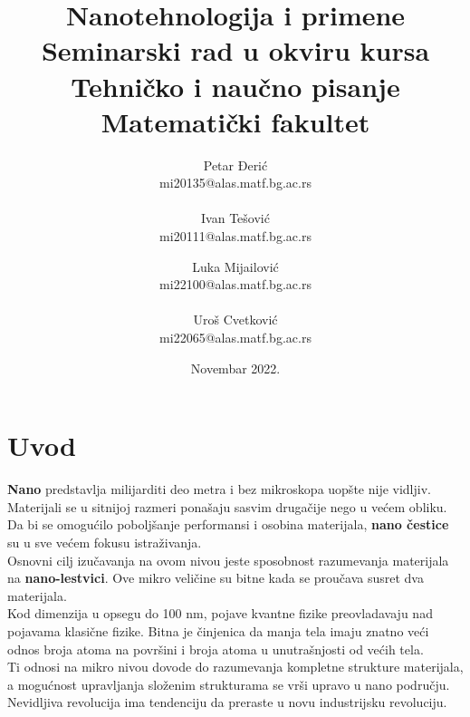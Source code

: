 \documentclass[a4paper]{article}
\begin{document}
\title{Nanotehnologija i primene\vspace{0ex}\\
\small{Seminarski rad u okviru kursa\\
Tehničko i naučno pisanje\\
Matematički fakultet}\vspace{3ex}}
\author{
Petar Đerić\\
mi20135@alas.matf.bg.ac.rs\\\\
Ivan Tešović\\
mi20111@alas.matf.bg.ac.rs\and
Luka Mijailović\\
mi22100@alas.matf.bg.ac.rs\\\\
Uroš Cvetković\\
mi22065@alas.matf.bg.ac.rs
}
\date{Novembar 2022.}

\maketitle

 
\tableofcontents                 
\newpage

\section{Uvod}
\label{sec:uvod}
\sloppy \textbf{Nano} predstavlja milijarditi deo metra i bez mikroskopa uopšte nije vidljiv. Materijali se u sitnijoj razmeri ponašaju sasvim drugačije nego u većem obliku. Da bi se omogućilo poboljšanje performansi i osobina materijala, \textbf{nano čestice} su u sve većem fokusu istraživanja.\\ Osnovni cilj izučavanja na ovom nivou jeste sposobnost razumevanja materijala na \textbf{nano-lestvici}. Ove mikro veličine su bitne kada se proučava susret dva materijala.\\ Kod dimenzija u opsegu do 100 nm, pojave kvantne fizike preovladavaju nad pojavama klasične fizike. Bitna je činjenica da manja tela imaju znatno veći odnos broja atoma na površini i broja atoma u unutrašnjosti od većih tela.\\ Ti odnosi na mikro nivou dovode do razumevanja kompletne strukture materijala, a mogućnost upravljanja složenim strukturama se vrši upravo u nano području. Nevidljiva revolucija ima tendenciju da preraste u novu industrijsku revoluciju.
\end{document}
